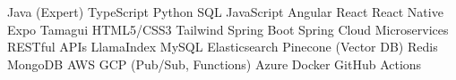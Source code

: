 
\begin{cvskills}
    \setlength\itemsep{1.2mm}
     {Java (Expert)\hspace{2mm} TypeScript\hspace{2mm} Python\hspace{2mm} SQL\hspace{2mm} JavaScript}
     {Angular\hspace{2mm} React\hspace{2mm} React Native\hspace{2mm} Expo\hspace{2mm} Tamagui\hspace{2mm} HTML5/CSS3\hspace{2mm} Tailwind}
     {Spring Boot\hspace{2mm} Spring Cloud\hspace{2mm} Microservices\hspace{2mm} RESTful APIs\hspace{2mm} LlamaIndex}
     {MySQL\hspace{2mm} Elasticsearch\hspace{2mm} Pinecone (Vector DB)\hspace{2mm} Redis\hspace{2mm} MongoDB}
     {AWS \hspace{2mm} GCP (Pub/Sub, Functions)\hspace{2mm} Azure\hspace{2mm} Docker\hspace{2mm} GitHub Actions}
\end{cvskills}